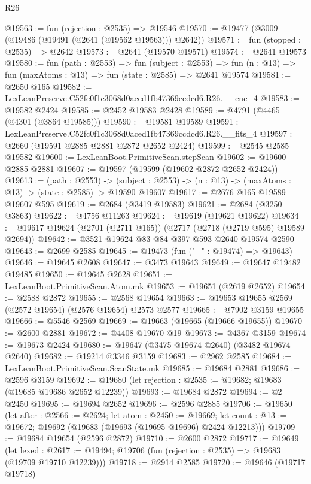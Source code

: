\begin{lexlean}{R26}
\begin{coremodule}
@19563 := fun (rejection : @2535) => @19546
@19570 := @19477 (@3009 (@19486 (@19491 (@2641 (@19562 @19563))) @2642))
@19571 := fun (stopped : @2535) => @2642
@19573 := @2641 (@19570 @19571)
@19574 := @2641 @19573
@19580 := fun (path : @2553) =>
  fun (subject : @2553) =>
  fun (n : @13) => fun (maxAtoms : @13) => fun (state : @2585) => @2641 @19574
@19581 := @2650 @165
@19582 := LexLeanPreserve.C52fc0f1c3068d0aced1fb47369ccdcd6.R26.__enc_4
@19583 := @19582 @2424
@19585 := @2452 @19583 @2428
@19589 := @4791 (@4465 (@4301 (@3864 @19585)))
@19590 := @19581 @19589
@19591 := LexLeanPreserve.C52fc0f1c3068d0aced1fb47369ccdcd6.R26.__fits_4
@19597 := @2660 (@19591 @2885 @2881 @2872 @2652 @2424)
@19599 := @2545 @2585 @19582
@19600 := LexLeanBoot.PrimitiveScan.stepScan
@19602 := @19600 @2885 @2881
@19607 := @19597 (@19599 (@19602 @2872 @2652 @2424))
@19613 := (path : @2553) ->
  (subject : @2553) -> (n : @13) -> (maxAtoms : @13) -> (state : @2585) -> @19590 @19607
@19617 := @2676 @165 @19589 @19607 @595
@19619 := @2684 (@3419 @19583)
@19621 := @2684 (@3250 @3863)
@19622 := @4756 @11263
@19624 := @19619 (@19621 @19622)
@19634 := @19617 @19624 (@2701 (@2711 @165)) (@2717 (@2718 (@2719 @595) @19589 @2694))
@19642 := @3521 @19624 @83 @84 @397 @593 @2640 @19574 @2590
@19643 := @2699 @2585
@19645 := @19473 (fun ("_" : @19474) => @19643)
@19646 := @19645 @2608
@19647 := @3473 @19643
@19649 := @19647 @19482 @19485
@19650 := @19645 @2628
@19651 := LexLeanBoot.PrimitiveScan.Atom.mk
@19653 := @19651 (@2619 @2652)
@19654 := @2588 @2872
@19655 := @2568 @19654
@19663 := @19653 @19655 @2569 (@2572 @19654) (@2576 @19654) @2573 @2577
@19665 := @7902 @3159 @19655
@19666 := @5546 @2569
@19669 := @19663 (@19665 (@19666 @19655))
@19670 := @2600 @2881
@19672 := @4408 @19670 @19
@19673 := @4367 @3159
@19674 := @19673 @2424
@19680 := @19647 (@3475 @19674 @2640) (@3482 @19674 @2640)
@19682 := @19214 @3346 @3159
@19683 := @2962 @2585
@19684 := LexLeanBoot.PrimitiveScan.ScanState.mk
@19685 := @19684 @2881
@19686 := @2596 @3159
@19692 := @19680 (let rejection : @2535 := @19682; @19683 (@19685 @19686 @2652 @12239))
@19693 := @19684 @2872
@19694 := @2 @2450
@19695 := @19694 @2652
@19696 := @2596 @2885
@19706 := @19650
    (let after : @2566 := @2624;
    let atom : @2450 := @19669;
    let count : @13 := @19672; @19692 (@19683 (@19693 (@19695 @19696) @2424 @12213)))
@19709 := @19684 @19654 (@2596 @2872)
@19710 := @2600 @2872
@19717 := @19649
    (let lexed : @2617 := @19494; @19706 (fun (rejection : @2535) => @19683 (@19709 @19710 @12239)))
@19718 := @2914 @2585
@19720 := @19646 (@19717 @19718)

\end{coremodule}
\end{lexlean}
